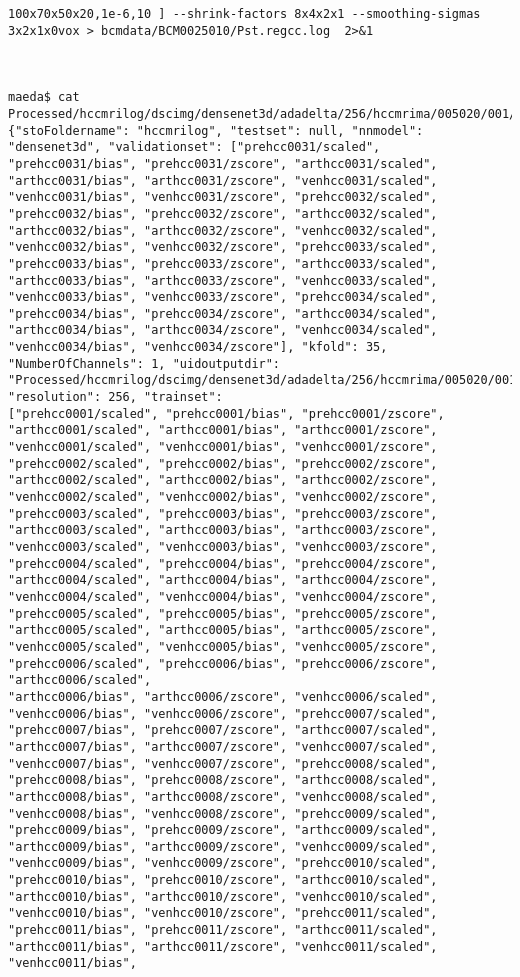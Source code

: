 \documentclass{article}         %
\theoremstyle{definition}
\theoremstyle{remark}
\begin{document}
\begin{verbatim}
100x70x50x20,1e-6,10 ] --shrink-factors 8x4x2x1 --smoothing-sigmas 3x2x1x0vox > bcmdata/BCM0025010/Pst.regcc.log  2>&1



maeda$ cat Processed/hccmrilog/dscimg/densenet3d/adadelta/256/hccmrima/005020/001/000/setup.json
{"stoFoldername": "hccmrilog", "testset": null, "nnmodel": "densenet3d", "validationset": ["prehcc0031/scaled", "prehcc0031/bias", "prehcc0031/zscore", "arthcc0031/scaled", "arthcc0031/bias", "arthcc0031/zscore", "venhcc0031/scaled", "venhcc0031/bias", "venhcc0031/zscore", "prehcc0032/scaled", "prehcc0032/bias", "prehcc0032/zscore", "arthcc0032/scaled", "arthcc0032/bias", "arthcc0032/zscore", "venhcc0032/scaled", "venhcc0032/bias", "venhcc0032/zscore", "prehcc0033/scaled", "prehcc0033/bias", "prehcc0033/zscore", "arthcc0033/scaled", "arthcc0033/bias", "arthcc0033/zscore", "venhcc0033/scaled", "venhcc0033/bias", "venhcc0033/zscore", "prehcc0034/scaled", "prehcc0034/bias", "prehcc0034/zscore", "arthcc0034/scaled", "arthcc0034/bias", "arthcc0034/zscore", "venhcc0034/scaled", "venhcc0034/bias", "venhcc0034/zscore"], "kfold": 35, "NumberOfChannels": 1, "uidoutputdir": "Processed/hccmrilog/dscimg/densenet3d/adadelta/256/hccmrima/005020/001/000", "resolution": 256, "trainset":
["prehcc0001/scaled", "prehcc0001/bias", "prehcc0001/zscore", "arthcc0001/scaled", "arthcc0001/bias", "arthcc0001/zscore", "venhcc0001/scaled", "venhcc0001/bias", "venhcc0001/zscore", "prehcc0002/scaled", "prehcc0002/bias", "prehcc0002/zscore", "arthcc0002/scaled", "arthcc0002/bias", "arthcc0002/zscore", "venhcc0002/scaled", "venhcc0002/bias", "venhcc0002/zscore", "prehcc0003/scaled", "prehcc0003/bias", "prehcc0003/zscore", "arthcc0003/scaled", "arthcc0003/bias", "arthcc0003/zscore", "venhcc0003/scaled", "venhcc0003/bias", "venhcc0003/zscore", "prehcc0004/scaled", "prehcc0004/bias", "prehcc0004/zscore", "arthcc0004/scaled", "arthcc0004/bias", "arthcc0004/zscore", "venhcc0004/scaled", "venhcc0004/bias", "venhcc0004/zscore", "prehcc0005/scaled", "prehcc0005/bias", "prehcc0005/zscore", "arthcc0005/scaled", "arthcc0005/bias", "arthcc0005/zscore", "venhcc0005/scaled", "venhcc0005/bias", "venhcc0005/zscore", "prehcc0006/scaled", "prehcc0006/bias", "prehcc0006/zscore", "arthcc0006/scaled",
"arthcc0006/bias", "arthcc0006/zscore", "venhcc0006/scaled", "venhcc0006/bias", "venhcc0006/zscore", "prehcc0007/scaled", "prehcc0007/bias", "prehcc0007/zscore", "arthcc0007/scaled", "arthcc0007/bias", "arthcc0007/zscore", "venhcc0007/scaled", "venhcc0007/bias", "venhcc0007/zscore", "prehcc0008/scaled", "prehcc0008/bias", "prehcc0008/zscore", "arthcc0008/scaled", "arthcc0008/bias", "arthcc0008/zscore", "venhcc0008/scaled", "venhcc0008/bias", "venhcc0008/zscore", "prehcc0009/scaled", "prehcc0009/bias", "prehcc0009/zscore", "arthcc0009/scaled", "arthcc0009/bias", "arthcc0009/zscore", "venhcc0009/scaled", "venhcc0009/bias", "venhcc0009/zscore", "prehcc0010/scaled", "prehcc0010/bias", "prehcc0010/zscore", "arthcc0010/scaled", "arthcc0010/bias", "arthcc0010/zscore", "venhcc0010/scaled", "venhcc0010/bias", "venhcc0010/zscore", "prehcc0011/scaled", "prehcc0011/bias", "prehcc0011/zscore", "arthcc0011/scaled", "arthcc0011/bias", "arthcc0011/zscore", "venhcc0011/scaled", "venhcc0011/bias",

\end{verbatim}
\end{document}
